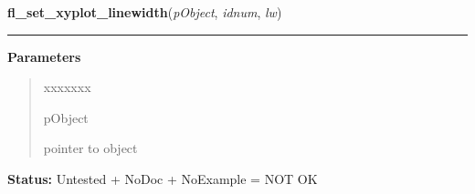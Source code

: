     \label{xformslib:library:fl_set_xyplot_linewidth}

    \vspace{0.5ex}

\hspace{.8\funcindent}\begin{boxedminipage}{\funcwidth}

    \raggedright \textbf{fl\_set\_xyplot\_linewidth}(\textit{pObject}, \textit{idnum}, \textit{lw})

    \vspace{-1.5ex}

    \rule{\textwidth}{0.5\fboxrule}
\setlength{\parskip}{2ex}
\setlength{\parskip}{1ex}
      \textbf{Parameters}
      \vspace{-1ex}

      \begin{quote}
        \begin{Ventry}{xxxxxxx}

          \item[pObject]

          pointer to object

        \end{Ventry}

      \end{quote}

\textbf{Status:} Untested + NoDoc + NoExample = NOT OK



    \end{boxedminipage}

    \label{xformslib:library:fl_set_xyplot_xgrid}

    \vspace{0.5ex}

